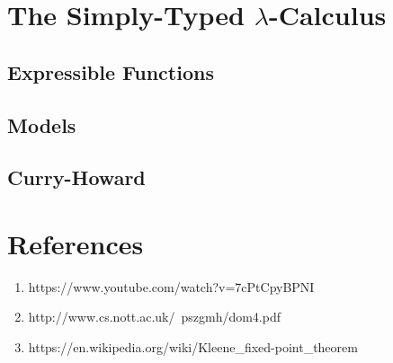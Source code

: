 \documentclass[12pt]{article}
\begin{document}
\section{The Simply-Typed $\lambda$-Calculus}

\subsection{Expressible Functions}

\subsection{Models}

\subsection{Curry-Howard}

\section{References}

\begin{enumerate}
\item https://www.youtube.com/watch?v=7cPtCpyBPNI

\item http://www.cs.nott.ac.uk/~pszgmh/dom4.pdf

\item  https://en.wikipedia.org/wiki/Kleene_fixed-point_theorem
\end{enumerate}
\end{document}
